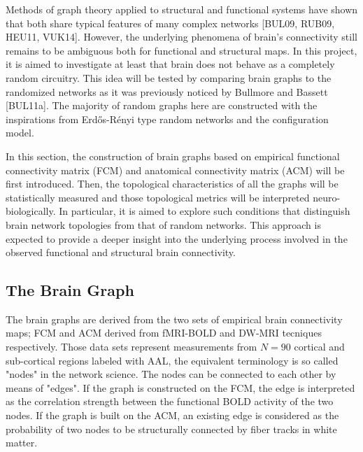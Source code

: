 Methods of graph theory applied to structural and functional systems have shown that both share typical features of many complex networks [BUL09, RUB09, HEU11, VUK14]. However, the underlying phenomena of brain's connectivity still remains to be ambiguous both for functional and structural maps. In this project, it is aimed to investigate at least that brain does not behave as a completely random circuitry. This idea will be tested by comparing brain graphs to the randomized networks as it was previously noticed by Bullmore and Bassett [BUL11a]. The majority of random graphs here are constructed with the inspirations from  Erd\H{o}s-R\'{e}nyi type random networks and the configuration model. 
 

In this section, the construction of brain graphs based on empirical functional connectivity matrix (FCM) and anatomical connectivity matrix (ACM) will be first introduced. Then, the topological characteristics of all the graphs will be statistically measured and those topological metrics will be interpreted neuro-biologically. In particular, it is aimed to explore such conditions that distinguish brain network topologies from that of random networks. This approach is expected to provide a deeper insight into the underlying process involved in the observed functional and structural brain connectivity. 


\subsection{The Brain Graph}

The brain graphs are derived from the two sets of empirical brain connectivity maps; FCM and ACM derived from fMRI-BOLD and DW-MRI tecniques respectively. Those data sets represent measurements from $N=90$ cortical and sub-cortical regions labeled with AAL, the equivalent terminology is so called "nodes" in the network science. The nodes can be connected to each other by means of "edges". If the graph is constructed on the FCM, the edge is interpreted as the correlation strength between the functional BOLD activity of the two nodes. If the graph is built on the ACM, an existing edge is considered as the probability of two nodes to be structurally connected by fiber tracks in white matter.

